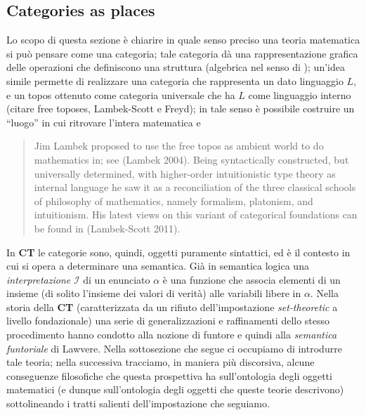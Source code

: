 \subsection{Categories as places}
Lo scopo di questa sezione è chiarire in quale senso preciso una teoria matematica si può pensare come una categoria; tale categoria dà una rappresentazione grafica delle operazioni che definiscono una struttura (algebrica nel senso di \cite{Kurosh:o:altri}); un'idea simile permette di realizzare una categoria che rappresenta un dato linguaggio $L$, e un topos ottenuto come categoria universale che ha $L$ come linguaggio interno (citare free toposes, Lambek-Scott e Freyd); in tale senso è possibile costruire un ``luogo'' in cui ritrovare l'intera matematica e
\begin{quote}
	Jim Lambek proposed to use the free topos as ambient world to do mathematics in; see (Lambek 2004). Being syntactically constructed, but universally determined, with higher-order intuitionistic type theory as internal language he saw it as a reconciliation of the three classical schools of philosophy of mathematics, namely formalism, platonism, and intuitionism. His latest views on this variant of categorical foundations can be found in (Lambek-Scott 2011).
\end{quote}
In \textbf{CT} le categorie sono, quindi, oggetti puramente sintattici, ed è il contesto in cui si opera a determinare una semantica. Già in semantica logica una \emph{interpretazione} $\mathcal{I}$ di un enunciato $\alpha$ è una funzione che associa elementi di un insieme (di solito l'insieme dei valori di verità) alle variabili libere in $\alpha$. Nella storia della \textbf{CT} (caratterizzata da un rifiuto dell'impostazione \emph{set-theoretic} a livello fondazionale) una serie di generalizzazioni e raffinamenti dello stesso procedimento hanno condotto alla nozione di funtore e quindi alla \emph{semantica funtoriale} di Lawvere. Nella sottosezione che segue ci occupiamo di introdurre tale teoria; nella successiva tracciamo, in maniera più discorsiva, alcune conseguenze filosofiche che questa prospettiva ha sull'ontologia degli oggetti matematici (e dunque sull'ontologia degli oggetti che queste teorie descrivono) sottolineando i tratti salienti dell'impostazione che seguiamo.
